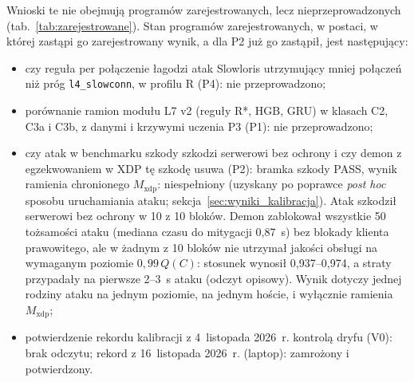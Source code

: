 \documentclass[a4paper,12pt]{article}
\begin{document}
Wnioski te nie obejmują programów zarejestrowanych, lecz nieprzeprowadzonych (tab.~\ref{tab:zarejestrowane}). Stan programów zarejestrowanych, w postaci, w której zastąpi go zarejestrowany wynik, a dla P2 już go zastąpił, jest następujący:
\begin{itemize}
    \item czy reguła per połączenie łagodzi atak Slowloris utrzymujący mniej połączeń niż próg \texttt{l4\_slowconn}, w profilu R (P4): nie przeprowadzono;
    \item porównanie ramion modułu L7 v2 (reguły R*, HGB, GRU) w klasach C2, C3a i C3b, z danymi i krzywymi uczenia P3 (P1): nie przeprowadzono;
    \item czy atak w benchmarku szkody szkodzi serwerowi bez ochrony i czy demon z egzekwowaniem w XDP tę szkodę usuwa (P2): bramka szkody PASS, wynik ramienia chronionego $M_{\mathrm{xdp}}$: niespełniony (uzyskany po poprawce \textit{post hoc} sposobu uruchamiania ataku; sekcja~\ref{sec:wyniki_kalibracja}). Atak szkodził serwerowi bez ochrony w 10 z 10 bloków. Demon zablokował wszystkie 50 tożsamości ataku (mediana czasu do mitygacji 0,87~s) bez blokady klienta prawowitego, ale w żadnym z 10 bloków nie utrzymał jakości obsługi na wymaganym poziomie $0{,}99\,Q(C)$: stosunek wynosił 0,937--0,974, a straty przypadały na pierwsze 2--3~s ataku (odczyt opisowy). Wynik dotyczy jednej rodziny ataku na jednym poziomie, na jednym hoście, i wyłącznie ramienia $M_{\mathrm{xdp}}$;
    \item potwierdzenie rekordu kalibracji z 4~listopada 2026~r. kontrolą dryfu (V0): brak odczytu; rekord z 16~listopada 2026~r. (laptop): zamrożony i potwierdzony.
\end{itemize}
\end{document}
